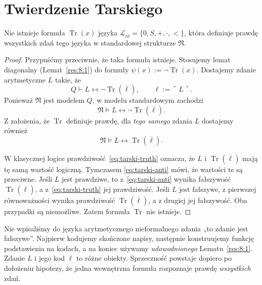 \section{Twierdzenie Tarskiego}
\begin{twierdzenie}\label{thm:tarski-semantic}
Nie istnieje formuła $\operatorname{Tr}(x)$ języka
$\mathcal L_{\mathrm{ar}}=\{0,S,+,\cdot,<\}$,
która definiuje prawdę wszystkich zdań tego języka
w standardowej strukturze $\mathfrak N$.
\end{twierdzenie}
\begin{proof}
Przypuśćmy przeciwnie, że taka formuła istnieje.
Stosujemy lemat diagonalny
(Lemat~\ref{res:8:1}) do formuły
$\psi(x):=\neg\operatorname{Tr}(x)$.
Dostajemy zdanie arytmetyczne $L$ takie, że
\[
Q\vdash L\leftrightarrow\neg\operatorname{Tr}(\overline\ell),
\qquad \ell:=\ulcorner L\urcorner.
\]
Ponieważ $\mathfrak N$ jest modelem $Q$, w modelu
standardowym zachodzi
\begin{equation}\label{eq:tarski-anti}
\mathfrak N\models
L\leftrightarrow\neg\operatorname{Tr}(\overline\ell).
\end{equation}
Z założenia, że $\operatorname{Tr}$ definiuje prawdę,
dla \emph{tego samego} zdania $L$ dostajemy również
\begin{equation}\label{eq:tarski-truth}
\mathfrak N\models
L\leftrightarrow\operatorname{Tr}(\overline\ell).
\end{equation}

W klasycznej logice prawdziwość~\eqref{eq:tarski-truth}
oznacza, że $L$ i $\operatorname{Tr}(\overline\ell)$
mają tę samą wartość logiczną. Tymczasem
\eqref{eq:tarski-anti} mówi, że wartości te są przeciwne.
Jeśli $L$ jest prawdziwe, to z~\eqref{eq:tarski-anti}
wynika fałszywość $\operatorname{Tr}(\overline\ell)$,
a z~\eqref{eq:tarski-truth} jej prawdziwość.
Jeśli $L$ jest fałszywe, z pierwszej równoważności
wynika prawdziwość $\operatorname{Tr}(\overline\ell)$,
a z drugiej jej fałszywość. Oba przypadki są niemożliwe.
Zatem formuła $\operatorname{Tr}$ nie istnieje.
\end{proof}

\begin{uwaga}
Nie wpisaliśmy do języka arytmetycznego nieformalnego
zdania „to zdanie jest fałszywe”.
Najpierw kodujemy skończone napisy, następnie
konstruujemy funkcję podstawienia na kodach,
a na koniec używamy \emph{udowodnionego}
Lematu~\ref{res:8:1}. Zdanie $L$ i jego kod $\ell$
to różne obiekty. Sprzeczność powstaje dopiero
po dołożeniu hipotezy, że jedna wewnętrzna formuła
rozpoznaje prawdę \emph{wszystkich} zdań.
\end{uwaga}

